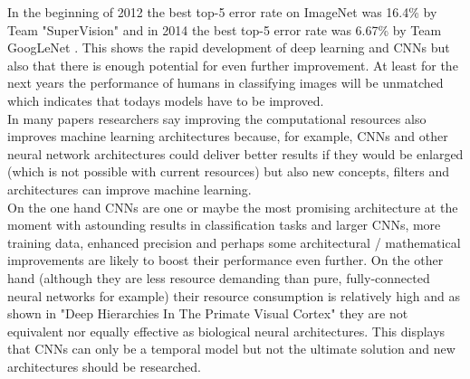\documentclass[12pt,twoside]{article}
\theoremstyle{plain}
\theoremstyle{definition}
\theoremstyle{remark}
\begin{document}
In the beginning of 2012 the best top-5 error rate on ImageNet was 16.4\% by Team "SuperVision" and in 2014 the best top-5 error rate was 6.67\% by Team GoogLeNet \cite{GoogLeNet}. This shows the rapid development of deep learning and CNNs but also that there is enough potential for even further improvement. At least for the next years the performance of humans in classifying images will be unmatched which indicates that todays models have to be improved.
\\
In many papers \cite{GoogLeNet, DeepNeuralNetworksObjectDetection-Szegedy, ImangeNetClassificationCNN-Krizhevsky, LearningDeepCompactImageTracking-Wang, MultiColumnDeepNeuralNetworksClassification-Ciresan} researchers say improving the computational resources also improves machine learning architectures because, for example, CNNs and other neural network architectures could deliver better results if they would be enlarged (which is not possible with current resources) but also new concepts, filters and architectures can improve machine learning.
\\
On the one hand CNNs are one or maybe the most promising architecture at the moment \cite{GoogLeNet, ImangeNetClassificationCNN-Krizhevsky} with astounding results in classification tasks and larger CNNs, more training data, enhanced precision and perhaps some architectural / mathematical improvements are likely to boost their performance even further.
On the other hand (although they are less resource demanding than pure, fully-connected neural networks for example) their resource consumption is relatively high and as shown in "Deep Hierarchies In The Primate Visual Cortex" \cite{DeepHierarchiesVisualCortex-kruger} they are not equivalent nor equally effective as biological neural architectures. This displays that CNNs can only be a temporal model but not the ultimate solution and new architectures should be researched.




%
%
\newpage


\end{document}
